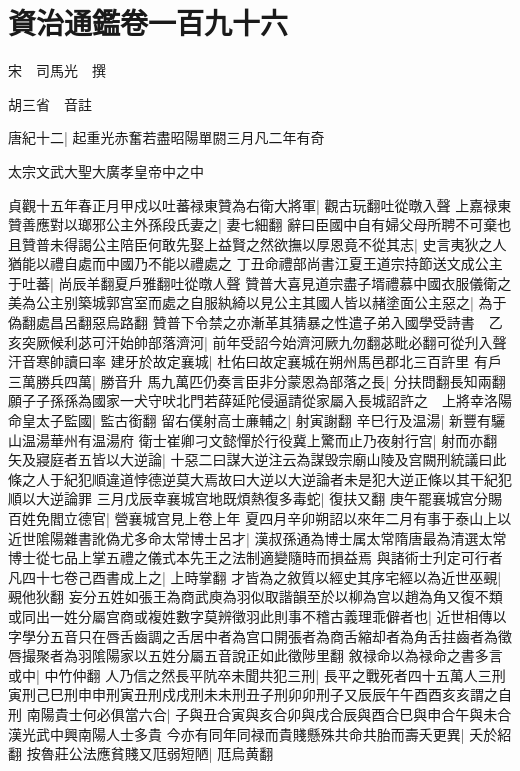 \chapter{資治通鑑卷一百九十六}
宋　司馬光　撰

胡三省　音註

唐紀十二|{
	起重光赤奮若盡昭陽單閼三月凡二年有奇}


太宗文武大聖大廣孝皇帝中之中

貞觀十五年春正月甲戍以吐蕃禄東贊為右衛大將軍|{
	觀古玩翻吐從暾入聲}
上嘉禄東贊善應對以瑯邪公主外孫段氏妻之|{
	妻七細翻}
辭曰臣國中自有婦父母所聘不可棄也且贊普未得謁公主陪臣何敢先娶上益賢之然欲撫以厚恩竟不從其志|{
	史言夷狄之人猶能以禮自處而中國乃不能以禮處之}
丁丑命禮部尚書江夏王道宗持節送文成公主于吐蕃|{
	尚辰羊翻夏戶雅翻吐從暾人聲}
贊普大喜見道宗盡子壻禮慕中國衣服儀衛之美為公主别築城郭宫室而處之自服紈綺以見公主其國人皆以赭塗面公主惡之|{
	為于偽翻處昌呂翻惡烏路翻}
贊普下令禁之亦漸革其猜暴之性遣子弟入國學受詩書　乙亥突厥候利苾可汗始帥部落濟河|{
	前年受詔今始濟河厥九勿翻苾毗必翻可從刋入聲汗音寒帥讀曰率}
建牙於故定襄城|{
	杜佑曰故定襄城在朔州馬邑郡北三百許里}
有戶三萬勝兵四萬|{
	勝音升}
馬九萬匹仍奏言臣非分蒙恩為部落之長|{
	分扶問翻長知兩翻}
願子子孫孫為國家一犬守吠北門若薛延陀侵逼請從家屬入長城詔許之　上將幸洛陽命皇太子監國|{
	監古銜翻}
留右僕射高士亷輔之|{
	射寅謝翻}
辛巳行及温湯|{
	新豐有驪山温湯華州有温湯府}
衛士崔卿刁文懿憚於行役冀上驚而止乃夜射行宫|{
	射而亦翻}
矢及寢庭者五皆以大逆論|{
	十惡二曰謀大逆注云為謀毁宗廟山陵及宫闕刑統議曰此條之人于紀犯順違道悖德逆莫大焉故曰大逆以大逆論者未是犯大逆正條以其干紀犯順以大逆論罪}
三月戊辰幸襄城宫地既煩熱復多毒蛇|{
	復扶又翻}
庚午罷襄城宫分賜百姓免閻立德官|{
	營襄城宫見上卷上年}
夏四月辛卯朔詔以來年二月有事于泰山上以近世隂陽雜書訛偽尤多命太常博士呂才|{
	漢叔孫通為博士属太常隋唐最為清選太常博士從七品上掌五禮之儀式本先王之法制適變隨時而損益焉}
與諸術士刋定可行者凡四十七卷己酉書成上之|{
	上時掌翻}
才皆為之敘質以經史其序宅經以為近世巫覡|{
	覡他狄翻}
妄分五姓如張王為商武庾為羽似取諧韻至於以柳為宫以趙為角又復不類或同出一姓分屬宫商或複姓數字莫辨徵羽此則事不稽古義理乖僻者也|{
	近世相傳以字學分五音只在唇舌齒調之舌居中者為宫口開張者為商舌縮却者為角舌拄齒者為徵唇撮聚者為羽隂陽家以五姓分屬五音說正如此徵陟里翻}
敘禄命以為禄命之書多言或中|{
	中竹仲翻}
人乃信之然長平阬卒未聞共犯三刑|{
	長平之戰死者四十五萬人三刑寅刑己巳刑申申刑寅丑刑戍戌刑未未刑丑子刑卯卯刑子又辰辰午午酉酉亥亥謂之自刑}
南陽貴士何必俱當六合|{
	子與丑合寅與亥合卯與戌合辰與酉合巳與申合午與未合漢光武中興南陽人士多貴}
今亦有同年同禄而貴賤懸殊共命共胎而壽夭更異|{
	夭於紹翻}
按魯莊公法應貧賤又尫弱短陋|{
	尫烏黄翻}

